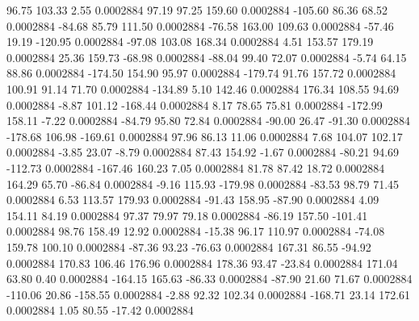        96.75      103.33        2.55     0.0002884
       97.19       97.25      159.60     0.0002884
     -105.60       86.36       68.52     0.0002884
      -84.68       85.79      111.50     0.0002884
      -76.58      163.00      109.63     0.0002884
      -57.46       19.19     -120.95     0.0002884
      -97.08      103.08      168.34     0.0002884
        4.51      153.57      179.19     0.0002884
       25.36      159.73      -68.98     0.0002884
      -88.04       99.40       72.07     0.0002884
       -5.74       64.15       88.86     0.0002884
     -174.50      154.90       95.97     0.0002884
     -179.74       91.76      157.72     0.0002884
      100.91       91.14       71.70     0.0002884
     -134.89        5.10      142.46     0.0002884
      176.34      108.55       94.69     0.0002884
       -8.87      101.12     -168.44     0.0002884
        8.17       78.65       75.81     0.0002884
     -172.99      158.11       -7.22     0.0002884
      -84.79       95.80       72.84     0.0002884
      -90.00       26.47      -91.30     0.0002884
     -178.68      106.98     -169.61     0.0002884
       97.96       86.13       11.06     0.0002884
        7.68      104.07      102.17     0.0002884
       -3.85       23.07       -8.79     0.0002884
       87.43      154.92       -1.67     0.0002884
      -80.21       94.69     -112.73     0.0002884
     -167.46      160.23        7.05     0.0002884
       81.78       87.42       18.72     0.0002884
      164.29       65.70      -86.84     0.0002884
       -9.16      115.93     -179.98     0.0002884
      -83.53       98.79       71.45     0.0002884
        6.53      113.57      179.93     0.0002884
      -91.43      158.95      -87.90     0.0002884
        4.09      154.11       84.19     0.0002884
       97.37       79.97       79.18     0.0002884
      -86.19      157.50     -101.41     0.0002884
       98.76      158.49       12.92     0.0002884
      -15.38       96.17      110.97     0.0002884
      -74.08      159.78      100.10     0.0002884
      -87.36       93.23      -76.63     0.0002884
      167.31       86.55      -94.92     0.0002884
      170.83      106.46      176.96     0.0002884
      178.36       93.47      -23.84     0.0002884
      171.04       63.80        0.40     0.0002884
     -164.15      165.63      -86.33     0.0002884
      -87.90       21.60       71.67     0.0002884
     -110.06       20.86     -158.55     0.0002884
       -2.88       92.32      102.34     0.0002884
     -168.71       23.14      172.61     0.0002884
        1.05       80.55      -17.42     0.0002884
